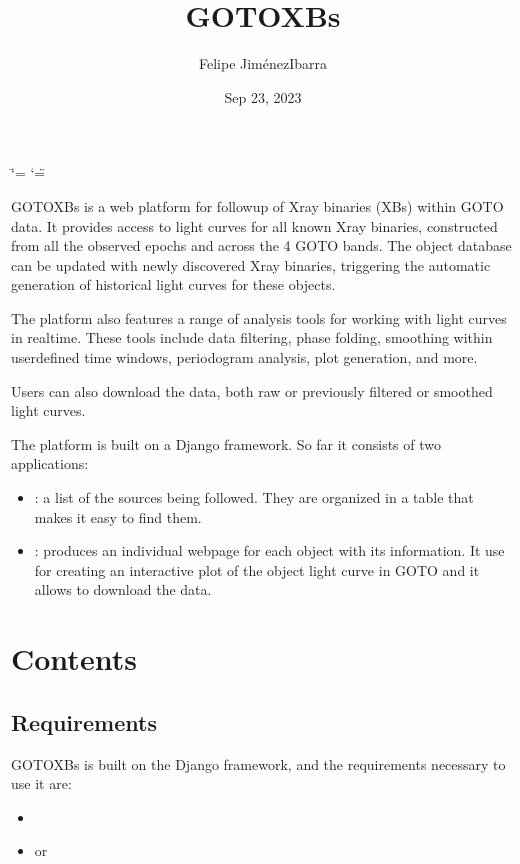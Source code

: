 \documentclass[letterpaper,10pt,english]{sphinxmanual}
\title{GOTO\sphinxhyphen{}XBs}
\date{Sep 23, 2023}
\author{Felipe Jiménez\sphinxhyphen{}Ibarra}
\begin{document}
\ifdefined\shorthandoff
  \ifnum\catcode`\=\string=\active\shorthandoff{=}\fi
  \ifnum\catcode`\"=\active{}\fi
\fi

\pagestyle{empty}
\sphinxmaketitle
\pagestyle{plain}
\sphinxtableofcontents
\pagestyle{normal}
\label{\detokenize{index::doc}}


\sphinxAtStartPar
GOTO\sphinxhyphen{}XBs is a web platform for follow\sphinxhyphen{}up of X\sphinxhyphen{}ray binaries (XBs) within GOTO data. It provides access to light curves for all known X\sphinxhyphen{}ray binaries, constructed from all the observed epochs and across the 4 GOTO bands. The object database can be updated with newly discovered X\sphinxhyphen{}ray binaries, triggering the automatic generation of historical light curves for these objects.

\sphinxAtStartPar
The platform also features a range of analysis tools for working with light curves in real\sphinxhyphen{}time. These tools include data filtering, phase folding,  smoothing within user\sphinxhyphen{}defined time windows, periodogram analysis, plot generation, and more.

\sphinxAtStartPar
Users can also download the data, both raw or previously filtered or smoothed light curves.

\sphinxAtStartPar
The platform is built on a Django framework. So far it consists of two applications:
\begin{itemize}
\item {} 
\sphinxAtStartPar
{}: a list of the sources being followed. They are organized in a table that makes it easy to find them.

\item {} 
\sphinxAtStartPar
{}:  produces an individual webpage for each object with its information. It use  for creating an interactive plot of the object light curve in GOTO and it allows to download the data.

\end{itemize}


\chapter{Contents}
\label{\detokenize{index:contents}}
\sphinxstepscope


\section{Requirements}
\label{\detokenize{requirements:requirements}}\label{\detokenize{requirements::doc}}
\sphinxAtStartPar
GOTO\sphinxhyphen{}XBs is built on the Django framework, and the requirements necessary to use it are:
\begin{itemize}
\item {} 
\sphinxAtStartPar
{}

\item {} 
\sphinxAtStartPar
{} or 

\end{itemize}
\end{document}
